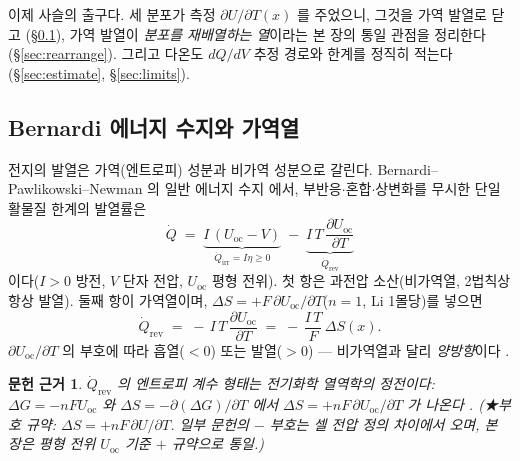 \documentclass[11pt,a4paper]{article}
\newtheorem*{srcbox}{문헌 근거}
\newcommand{\rev}{\mathrm{rev}}
\newcommand{\irr}{\mathrm{irr}}
\newcommand{\oc}{\mathrm{oc}}
\begin{document}
이제 사슬의 출구다. 세 분포가 측정 $\partial U/\partial T(x)$ 를 주었으니, 그것을 가역 발열로 닫고
(\S\ref{sec:bernardi}), 가역 발열이 \emph{분포를 재배열하는 열}이라는 본 장의 통일 관점을 정리한다
(\S\ref{sec:rearrange}). 그리고 다온도 $dQ/dV$ 추정 경로와 한계를 정직히 적는다(\S\ref{sec:estimate},
\S\ref{sec:limits}).

\subsection{Bernardi 에너지 수지와 가역열}\label{sec:bernardi}
전지의 발열은 가역(엔트로피) 성분과 비가역 성분으로 갈린다. Bernardi--Pawlikowski--Newman 의 일반 에너지
수지 \cite{bernardi1985} 에서, 부반응$\cdot$혼합$\cdot$상변화를 무시한 단일 활물질 한계의 발열률은
\begin{equation}
\dot Q \;=\; \underbrace{I\,(U_\oc-V)}_{\dot Q_\irr=I\eta\ge0}
        \;-\; \underbrace{I\,T\,\frac{\partial U_\oc}{\partial T}}_{\dot Q_\rev}
\label{eq:bernardi}
\end{equation}
이다($I>0$ 방전, $V$ 단자 전압, $U_\oc$ 평형 전위). 첫 항은 과전압 소산(비가역열, 2법칙상 항상 발열).
둘째 항이 가역열이며, $\Delta S=+F\,\partial U_\oc/\partial T$($n=1$, Li 1몰당)를 넣으면
\begin{equation}
\boxed{\;
\dot Q_\rev \;=\; -\,I\,T\,\frac{\partial U_\oc}{\partial T}
            \;=\; -\,\frac{I\,T}{F}\,\Delta S(x).
\;}
\label{eq:qrev}
\end{equation}
$\partial U_\oc/\partial T$ 의 부호에 따라 흡열($<0$) 또는 발열($>0$) — 비가역열과 달리 \emph{양방향}이다
\cite{bernardi1985,standardised2024}.

\begin{srcbox}
$\dot Q_\rev$ 의 엔트로피 계수 형태는 전기화학 열역학의 정전이다: $\Delta G=-nFU_\oc$ 와
$\Delta S=-\partial(\Delta G)/\partial T$ 에서 $\Delta S=+nF\,\partial U_\oc/\partial T$ 가 나온다
\cite{newman,msmr_partI}. (★부호 규약: $\Delta S=+nF\,\partial U/\partial T$. 일부 문헌의 $-$ 부호는 셀 전압
정의 차이에서 오며, 본 장은 평형 전위 $U_\oc$ 기준 $+$ 규약으로 통일.)
\end{srcbox}
\end{document}

